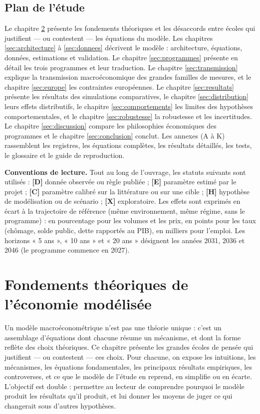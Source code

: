 \documentclass[
  11pt,
  11pt,
  a4paper,
  openany]{book}
\begin{document}
\hypertarget{sec:plan}{%
\section{Plan de l'étude}\label{sec:plan}}

Le chapitre \ref{sec:theorie} présente les fondements théoriques et les
désaccords entre écoles qui justifient --- ou contestent --- les
équations du modèle. Les chapitres \ref{sec:architecture} à
\ref{sec:donnees} décrivent le modèle : architecture, équations,
données, estimations et validation. Le chapitre \ref{sec:programmes}
présente en détail les trois programmes et leur traduction. Le chapitre
\ref{sec:transmission} explique la transmission macroéconomique des
grandes familles de mesures, et le chapitre \ref{sec:europe} les
contraintes européennes. Le chapitre \ref{sec:resultats} présente les
résultats des simulations comparatives, le chapitre
\ref{sec:distribution} leurs effets distributifs, le chapitre
\ref{sec:comportements} les limites des hypothèses comportementales, et
le chapitre \ref{sec:robustesse} la robustesse et les incertitudes. Le
chapitre \ref{sec:discussion} compare les philosophies économiques des
programmes et le chapitre \ref{sec:conclusion} conclut. Les annexes (A à
K) rassemblent les registres, les équations complètes, les résultats
détaillés, les tests, le glossaire et le guide de reproduction.

\textbf{Conventions de lecture.} Tout au long de l'ouvrage, les statuts
suivants sont utilisés : \textbf{{[}D{]}} donnée observée ou règle
publiée ; \textbf{{[}E{]}} paramètre estimé par le projet ;
\textbf{{[}C{]}} paramètre calibré sur la littérature ou sur une cible ;
\textbf{{[}H{]}} hypothèse de modélisation ou de scénario ;
\textbf{{[}X{]}} exploratoire. Les effets sont exprimés en écart à la
trajectoire de référence (même environnement, même régime, sans le
programme) : en pourcentage pour les volumes et les prix, en points pour
les taux (chômage, solde public, dette rapportés au PIB), en milliers
pour l'emploi. Les horizons « 5 ans », « 10 ans » et « 20 ans »
désignent les années 2031, 2036 et 2046 (le programme commence en 2027).

\hypertarget{sec:theorie}{%
\chapter{Fondements théoriques de l'économie
modélisée}\label{sec:theorie}}

Un modèle macroéconométrique n'est pas une théorie unique : c'est un
assemblage d'équations dont chacune résume un mécanisme, et dont la
forme reflète des choix théoriques. Ce chapitre présente les grandes
écoles de pensée qui justifient --- ou contestent --- ces choix. Pour
chacune, on expose les intuitions, les mécanismes, les équations
fondamentales, les principaux résultats empiriques, les controverses, et
ce que le modèle de l'étude en reprend, en simplifie ou en écarte.
L'objectif est double : permettre au lecteur de comprendre pourquoi le
modèle produit les résultats qu'il produit, et lui donner les moyens de
juger ce qui changerait sous d'autres hypothèses.
\end{document}
